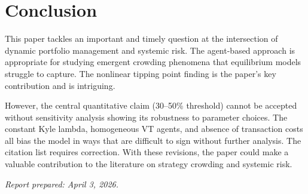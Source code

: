 \documentclass[12pt,a4paper]{article}
\begin{document}
\section*{Conclusion}

This paper tackles an important and timely question at the intersection of dynamic portfolio management and systemic risk. The agent-based approach is appropriate for studying emergent crowding phenomena that equilibrium models struggle to capture. The nonlinear tipping point finding is the paper's key contribution and is intriguing.

However, the central quantitative claim (30--50\% threshold) cannot be accepted without sensitivity analysis showing its robustness to parameter choices. The constant Kyle lambda, homogeneous VT agents, and absence of transaction costs all bias the model in ways that are difficult to sign without further analysis. The citation list requires correction. With these revisions, the paper could make a valuable contribution to the literature on strategy crowding and systemic risk.

\bigskip
\noindent\textit{Report prepared: April 3, 2026.}
\end{document}
